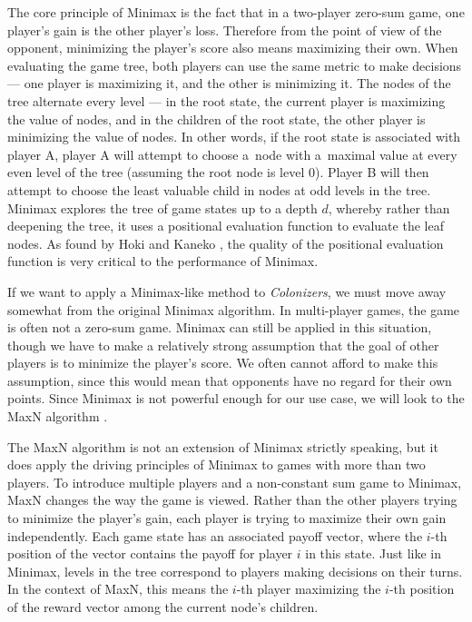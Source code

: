 The core principle of Minimax is the fact that in a two-player zero-sum game,
one player's gain is the other player's loss. Therefore from the point of view
of the opponent, minimizing the player's score also means maximizing their own.
When evaluating the game tree, both players can use the same metric to make decisions
--- one player is maximizing it, and the other is minimizing it.
The nodes of the tree alternate every level --- in the root state, the current player
is maximizing the value of nodes, and in the children of the root state, the other
player is minimizing the value of nodes. In other words, if the root state is associated
with player A, player A will attempt to choose a~node with a~maximal value at every
even level of the tree (assuming the root node is level 0). Player B will then attempt
to choose the least valuable child in nodes at odd levels in the tree.
Minimax explores the tree of game states up to a depth $d$, whereby rather than
deepening the tree, it uses a positional evaluation function to evaluate the leaf nodes.
As found by Hoki and Kaneko \cite{Hoki14}, the quality of the positional evaluation
function is very critical to the performance of Minimax.

If we want to apply a Minimax-like method to \emph{Colonizers}, we must move away
somewhat from the original Minimax algorithm. In multi-player games, the game
is often not a zero-sum game. Minimax can still be applied in this situation, though
we have to make a relatively strong assumption that the goal of other players
is to minimize the player's score. We often cannot afford to make this assumption,
since this would mean that opponents have no regard for their own points.
Since Minimax is not powerful enough for our use case, we will look
to the MaxN algorithm \cite{Luckhardt86}.

The MaxN algorithm is not an extension of Minimax strictly speaking, but it does
apply the driving principles of Minimax to games with more than two players.
To introduce multiple players and a non-constant sum game to Minimax, MaxN
changes the way the game is viewed. Rather than the other players trying to minimize
the player's gain, each player is trying to maximize their own gain independently.
Each game state has an associated payoff vector, where the $i$-th position of the vector
contains the payoff for player $i$ in this state. Just like in Minimax, levels
in the tree correspond to players making decisions on their turns. In the context
of MaxN, this means the $i$-th player maximizing the $i$-th position of the reward vector
among the current node's children.

